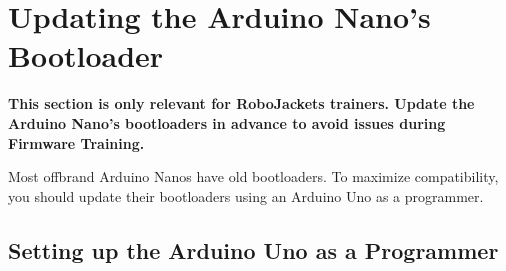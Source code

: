 \documentclass{article}
\begin{document}








\newpage

\section{Updating the Arduino Nano's  Bootloader}

{\bf This section is only relevant for RoboJackets trainers. Update the Arduino Nano's bootloaders in advance to avoid issues during Firmware Training.} \par

\vspace{1em}

Most offbrand Arduino Nanos have old bootloaders. To maximize compatibility, you should update their bootloaders using an Arduino Uno as a programmer.

\subsection{Setting up the Arduino Uno as a Programmer}
\end{document}
